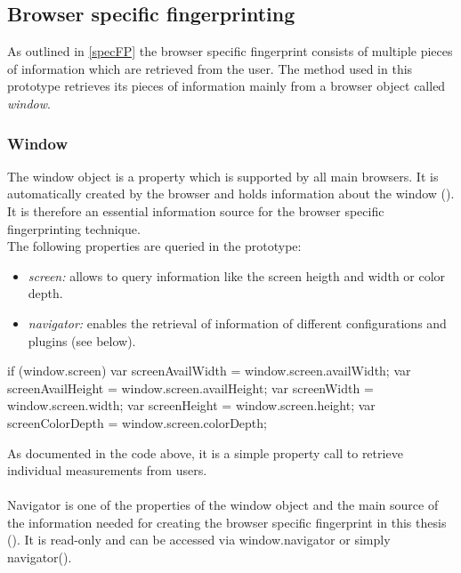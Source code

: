 \subsection{Browser specific fingerprinting} \label{sec:codeBrowserSpec}

As outlined in \autoref{specFP} the browser specific fingerprint consists of multiple pieces of information which are retrieved from the user. The method used in this prototype retrieves its pieces of information mainly from a browser object called \textit{window}.

\subsubsection{Window}
The window object is a property which is supported by all main browsers. It is automatically created by the browser and holds information about the window (\textcite{javatpt}). It is therefore an essential information source for the browser specific fingerprinting technique.\\

The following properties are queried in the prototype:
\begin{itemize}
	\item \textit{screen: }allows to query information like the screen heigth and width or color depth.
	\item \textit{navigator: }enables the retrieval of information of different configurations and plugins (see below).\\
\end{itemize}

\begin{JsCode}
	if (window.screen) {
		var screenAvailWidth = window.screen.availWidth;
		var screenAvailHeight = window.screen.availHeight;
		var screenWidth = window.screen.width;
		var screenHeight = window.screen.height;
		var screenColorDepth = window.screen.colorDepth;
	}
\end{JsCode}
As documented in the code above, it is a simple property call to retrieve individual measurements from users.\\\\
Navigator is one of the properties of the window object and the main source of the information needed for creating the browser specific fingerprint in this thesis (\textcite{javatpt}). It is read-only and can be accessed via window.navigator or simply navigator(\textcite{nav19}).\\

